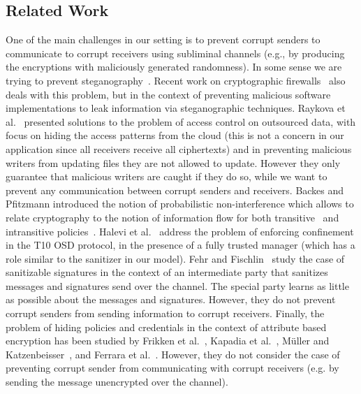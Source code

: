 \documentclass{llncs}
\begin{document}
\subsection{Related Work} 
One of the main challenges in our setting is to prevent corrupt senders to communicate to corrupt receivers using subliminal channels (e.g., by producing the encryptions with maliciously generated randomness). In some sense we are trying to prevent steganography~\cite{DBLP:conf/crypto/HopperLA02}. 
Recent work on cryptographic firewalls~\cite{DBLP:conf/eurocrypt/MironovS15,DBLP:journals/iacr/DodisMS15} also deals with this problem, but in the context of preventing malicious software implementations to leak information via steganographic techniques. 
Raykova et al.~\cite{DBLP:conf/fc/RaykovaZB12} presented solutions to the problem of access control on outsourced data, with focus on hiding the access patterns from the cloud (this is not a concern in our application since all receivers receive all ciphertexts) and in preventing malicious writers from updating files they are not allowed to update. However they only guarantee that malicious writers are caught if they do so, while we want to prevent any communication between corrupt senders and receivers. 
Backes and Pfitzmann introduced the notion of probabilistic non-interference which allows to relate cryptography to the notion of information flow for both transitive~\cite{DBLP:conf/sp/BackesP03} and intransitive policies~\cite{DBLP:journals/ijisec/BackesP04}. Halevi et al.~\cite{DBLP:journals/iacr/HaleviKN05} address the problem of enforcing confinement in the T10 OSD protocol, in the presence of a fully trusted manager (which has a role similar to the sanitizer in our model). 
Fehr and Fischlin~\cite{FF15} study the case of sanitizable signatures in the context of an intermediate party that sanitizes messages and signatures send over the channel. The special party learns as little as possible about the messages and signatures. However, they do not prevent corrupt senders from sending information to corrupt receivers. Finally, the problem of hiding policies and credentials in the context of attribute based encryption has been studied by Frikken et al.~\cite{FAL06}, Kapadia et al.~\cite{KTS07}, M{\"{u}}ller and Katzenbeisser~\cite{DBLP:conf/stm/MullerK11}, and Ferrara et al.~\cite{DBLP:conf/csfw/FerraraFLW15}. However, they do not consider the case of preventing corrupt sender from communicating with corrupt receivers (e.g. by sending the message unencrypted over the channel).
\end{document}
